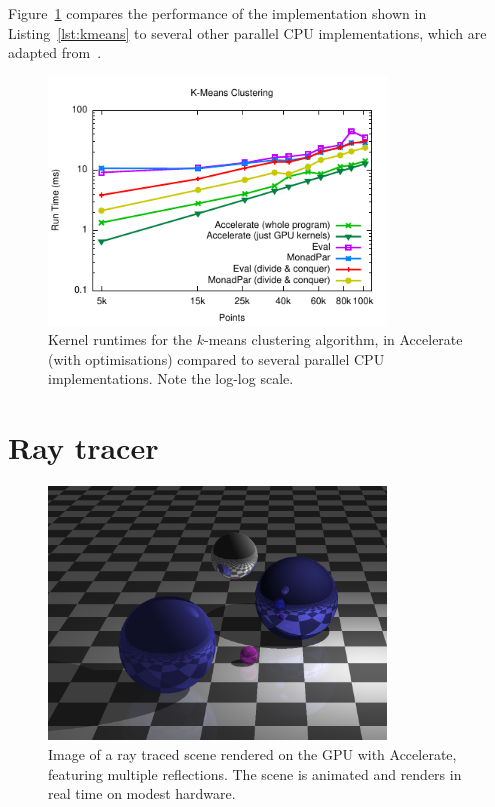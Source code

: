 Figure~\ref{fig:kmeans} compares the performance of the implementation shown in
Listing~\ref{lst:kmeans} to several other parallel CPU implementations, which
are adapted from~\cite{Marlow:2013wn}.


\begin{figure}
    \begin{center}
        \includegraphics[width=0.8\textwidth]{images/results/k-means/k-means}
    \end{center}
    \caption[K-means clustering kernel benchmarks]{Kernel runtimes for the
    $k$-means clustering algorithm, in Accelerate (with optimisations) compared
    to several parallel CPU implementations. Note the log-log scale.}
\label{fig:kmeans}
\end{figure}


\section{Ray tracer}
\label{sec:ray}

\begin{figure}
    \centering
    \includegraphics[width=0.8\textwidth]{images/results/ray/ray_sample}
    \caption[Ray tracer]{Image of a ray traced scene rendered on the GPU with
    Accelerate, featuring multiple reflections. The scene is animated and
    renders in real time on modest hardware.}
    \label{fig:ray_sample}
\end{figure}

